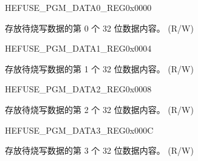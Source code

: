 \begin{register}{H}{EFUSE\_PGM\_DATA0\_REG}{0x0000}\label{regdesc:EFUSEPGMDATA0REG}
%
\regnewline%
\begin{regdesc}\begin{reglist}
\label{fielddesc:EFUSEPGMDATA0}\item [EFUSE\_PGM\_DATA\_0] 存放待烧写数据的第 0 个 32 位数据内容。 (R/W)
\end{reglist}\end{regdesc}
\end{register}


\begin{register}{H}{EFUSE\_PGM\_DATA1\_REG}{0x0004}\label{regdesc:EFUSEPGMDATA1REG}
%
\regnewline%
\begin{regdesc}\begin{reglist}
\label{fielddesc:EFUSEPGMDATA1}\item [EFUSE\_PGM\_DATA\_1] 存放待烧写数据的第 1 个 32 位数据内容。 (R/W)
\end{reglist}\end{regdesc}
\end{register}


\begin{register}{H}{EFUSE\_PGM\_DATA2\_REG}{0x0008}\label{regdesc:EFUSEPGMDATA2REG}
%
\regnewline%
\begin{regdesc}\begin{reglist}
\label{fielddesc:EFUSEPGMDATA2}\item [EFUSE\_PGM\_DATA\_2] 存放待烧写数据的第 2 个 32 位数据内容。 (R/W)
\end{reglist}\end{regdesc}
\end{register}


\begin{register}{H}{EFUSE\_PGM\_DATA3\_REG}{0x000C}\label{regdesc:EFUSEPGMDATA3REG}
%
\regnewline%
\begin{regdesc}\begin{reglist}
\label{fielddesc:EFUSEPGMDATA3}\item [EFUSE\_PGM\_DATA\_3] 存放待烧写数据的第 3 个 32 位数据内容。 (R/W)
\end{reglist}\end{regdesc}
\end{register}


